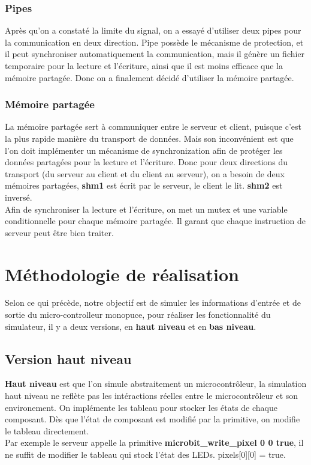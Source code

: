 \documentclass[14px]{article}
\begin{document}
\subsubsection{Pipes}
Après qu'on a constaté la limite du signal, on a essayé d'utiliser deux pipes pour la communication en deux direction. Pipe possède le mécanisme de protection, et il peut  synchroniser automatiquement la communication, mais il 	génère un fichier temporaire pour la lecture et l'écriture, ainsi que il est moins efficace que la mémoire partagée. Donc on a finalement décidé d'utiliser la mémoire partagée.

\subsubsection{Mémoire partagée}
La mémoire partagée sert à communiquer entre le serveur et client, puisque c'est la plus rapide manière du transport de données. Mais son inconvénient est que l'on doit implémenter un mécanisme de synchronization afin de protéger les données partagées pour la lecture et l'écriture. Donc pour deux directions du transport (du serveur au client et du client au serveur), on a besoin de deux mémoires partagées, \textbf{shm1} est écrit par le serveur, le client le lit. \textbf{shm2} est inversé.\\

Afin de synchroniser la lecture et l'écriture, on met un mutex et une variable conditionnelle pour chaque mémoire partagée. Il garant que chaque instruction de serveur peut être bien traiter.\\




\clearpage
\section{Méthodologie de réalisation}
Selon ce qui précède, notre objectif est de simuler les informations d'entrée et de sortie du micro-controlleur monopuce, pour réaliser les fonctionnalité du simulateur, il y a deux versions, en \textbf{haut niveau} et en \textbf{bas niveau}.

\subsection{Version haut niveau}
\textbf{Haut niveau} est que l'on simule abstraitement un microcontrôleur, la simulation haut niveau ne reflète pas les intéractions réelles entre le microcontrôleur et son environement. On implémente les tableau pour stocker les états de chaque composant. Dès que l'état de composant est modifié par la primitive, on modifie le tableau directement.\\
Par exemple le serveur appelle la primitive \textbf{microbit\_write\_pixel 0 0 true}, il ne suffit de modifier le tableau qui stock l'état des LEDs. pixels[0][0] = true.\\
\end{document}
